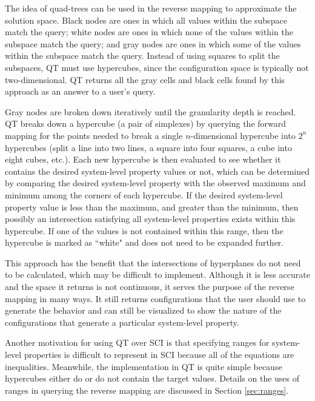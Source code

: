 The idea of quad-trees can be used in the reverse mapping to approximate the solution space.
Black nodes are ones in which all values within the subspace match the query;
white nodes are ones in which none of the values within the subspace match the query;
and gray nodes are ones in which some of the values within the subspace match the query.
Instead of using squares to split the subspaces, QT must use hypercubes, since the configuration space is typically not two-dimensional.
QT returns all the gray cells and black cells found by this approach as an answer to a user's query.

Gray nodes are broken down iteratively until the granularity depth is reached.
QT breaks down a hypercube (a pair of simplexes) by querying the forward mapping for the points needed to break a single $n$-dimensional hypercube into $2^n$ hypercubes (split a line into two lines, a square into four squares, a cube into eight cubes, etc.).
Each new hypercube is then evaluated to see whether it contains the desired system-level property values or not, which can be determined by comparing the desired system-level property with the observed maximum and minimum among the corners of each hypercube.
If the desired system-level property value is less than the maximum, and greater than the minimum, then possibly an intersection satisfying all system-level properties exists within this hypercube.
If one of the values is not contained within this range, then the hypercube is marked as ``white" and does not need to be expanded further.

This approach has the benefit that the intersections of hyperplanes do not need to be calculated, which may be difficult to implement.
Although it is less accurate and the space it returns is not continuous, it serves the purpose of the reverse mapping in many ways.
It still returns configurations that the user should use to generate the behavior and can still be visualized to show the nature of the configurations that generate a particular system-level property.

Another motivation for using QT over SCI is that specifying ranges for system-level properties is difficult to represent in SCI because all of the equations are inequalities.
Meanwhile, the implementation in QT is quite simple because hypercubes either do or do not contain the target values.
Details on the uses of ranges in querying the reverse mapping are discussed in Section \ref{sec:ranges}.

